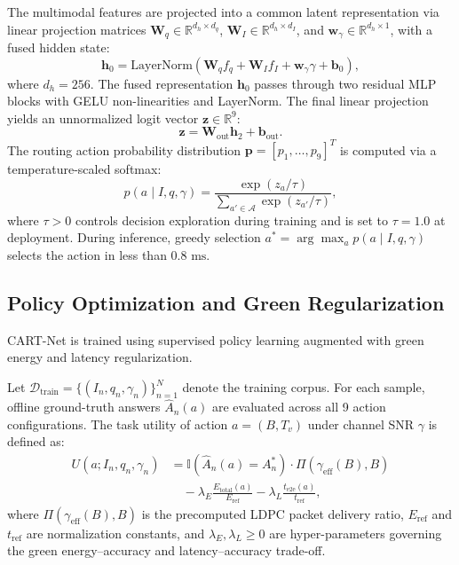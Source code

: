 The multimodal features are projected into a common latent representation via linear projection matrices $\mathbf{W}_q \in \mathbb{R}^{d_h \times d_q}$, $\mathbf{W}_I \in \mathbb{R}^{d_h \times d_I}$, and $\mathbf{w}_\gamma \in \mathbb{R}^{d_h \times 1}$, with a fused hidden state:
\begin{equation}
\mathbf{h}_0 = \mathrm{LayerNorm}\left( \mathbf{W}_q f_q + \mathbf{W}_I f_I + \mathbf{w}_\gamma \gamma + \mathbf{b}_0 \right),
\end{equation}
where $d_h = 256$. The fused representation $\mathbf{h}_0$ passes through two residual MLP blocks with GELU non-linearities and LayerNorm. The final linear projection yields an unnormalized logit vector $\mathbf{z} \in \mathbb{R}^9$:
\begin{equation}
\mathbf{z} = \mathbf{W}_{\mathrm{out}} \mathbf{h}_2 + \mathbf{b}_{\mathrm{out}}.
\end{equation}
The routing action probability distribution $\mathbf{p} = [p_1, \dots, p_9]^T$ is computed via a temperature-scaled softmax:
\begin{equation}
p(a \mid I, q, \gamma) = \frac{\exp\left(z_a / \tau\right)}{\sum_{a' \in \mathcal{A}} \exp\left(z_{a'} / \tau\right)},
\end{equation}
where $\tau > 0$ controls decision exploration during training and is set to $\tau = 1.0$ at deployment. During inference, greedy selection $a^* = \arg\max_{a} p(a \mid I, q, \gamma)$ selects the action in less than $0.8\text{ ms}$.

\subsection{Policy Optimization and Green Regularization}
CART-Net is trained using supervised policy learning augmented with green energy and latency regularization.

Let $\mathcal{D}_{\mathrm{train}} = \{(I_n, q_n, \gamma_n)\}_{n=1}^N$ denote the training corpus. For each sample, offline ground-truth answers $\hat{A}_n(a)$ are evaluated across all 9 action configurations. The task utility of action $a = (B, T_v)$ under channel SNR $\gamma$ is defined as:
\begin{equation}
\begin{split}
U(a; I_n, q_n, \gamma_n) &= \mathbb{I}(\hat{A}_n(a) = A_n^*) \cdot \Pi(\gamma_{\mathrm{eff}}(B), B) \\
&\quad - \lambda_E \frac{E_{\mathrm{total}}(a)}{E_{\mathrm{ref}}} - \lambda_L \frac{t_{\mathrm{e2e}}(a)}{t_{\mathrm{ref}}},
\end{split}
\end{equation}
where $\Pi(\gamma_{\mathrm{eff}}(B), B)$ is the precomputed LDPC packet delivery ratio, $E_{\mathrm{ref}}$ and $t_{\mathrm{ref}}$ are normalization constants, and $\lambda_E, \lambda_L \ge 0$ are hyper-parameters governing the green energy--accuracy and latency--accuracy trade-off.

